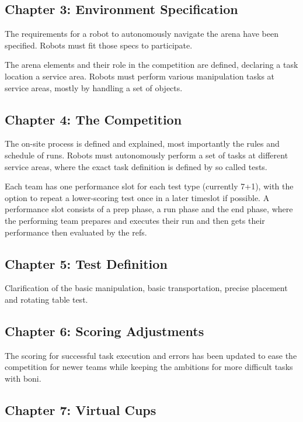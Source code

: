 \subsection{Chapter 3: Environment Specification}

The requirements for a robot to autonomously navigate the arena have been specified. Robots must fit those specs to participate.

The arena elements and their role in the competition are defined, declaring a task location a service area.
Robots must perform various manipulation tasks at service areas, mostly by handling a set of objects.



\subsection{Chapter 4: The Competition}

The on-site process is defined and explained, most importantly the rules and schedule of runs. Robots must autonomously perform a set of tasks at different service areas, where the exact task definition is defined by so called tests.

Each team has one performance slot for each test type (currently 7+1), with the option to repeat a lower-scoring test once in a later timeslot if possible.
A performance slot consists of a prep phase, a run phase and the end phase, where the performing team prepares and executes their run and then gets their performance then evaluated by the refs.

\subsection{Chapter 5: Test Definition}

Clarification of the basic manipulation, basic transportation, precise placement and rotating table test.


\subsection{Chapter 6: Scoring Adjustments}

The scoring for successful task execution and errors has been updated to ease the competition for newer teams while keeping the ambitions for more difficult tasks with boni.

\subsection{Chapter 7: Virtual Cups}

